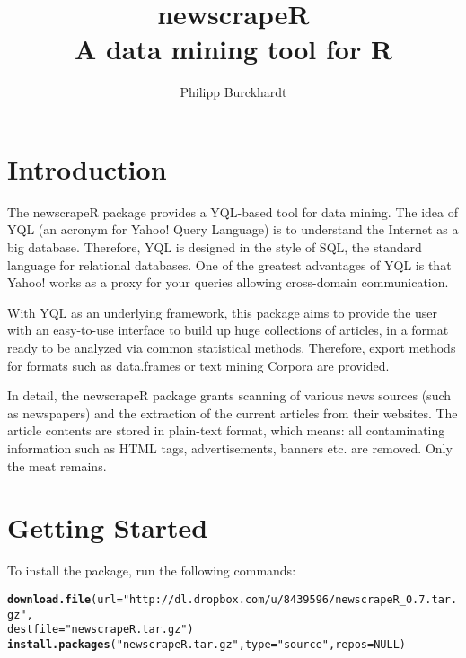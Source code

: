 \documentclass[a4paper,11pt]{article}\usepackage{graphicx, color}
\title{\textbf{newscrapeR} \\ A data mining tool for R}
\author{Philipp Burckhardt}
\makeatletter
\newcommand{\hlfunctioncall}[1]{\textcolor[rgb]{0.501960784313725,0,0.329411764705882}{\textbf{#1}}}%
\newcommand{\hlstring}[1]{\textcolor[rgb]{0.6,0.6,1}{#1}}%
\newenvironment{kframe}{%
 \def\at@end@of@kframe{}%
 \ifinner\ifhmode%
  \def\at@end@of@kframe{\end{minipage}}%
  \begin{minipage}{\columnwidth}%
 \fi\fi%
 \def\FrameCommand##1{\hskip\@totalleftmargin \hskip-\fboxsep
 \colorbox{shadecolor}{##1}\hskip-\fboxsep
     \hskip-\linewidth \hskip-\@totalleftmargin \hskip\columnwidth}%
 \MakeFramed {\advance\hsize-\width
   \@totalleftmargin\z@ \linewidth\hsize
   \@setminipage}}%
 {\par\unskip\endMakeFramed%
 \at@end@of@kframe}
\newenvironment{knitrout}{}{} %
\makeatother
\begin{document}
\maketitle

\section{Introduction}

The newscrapeR package provides a YQL-based tool for data mining. The idea of YQL (an acronym for Yahoo! Query Language) is to understand the Internet as a big database. Therefore, YQL is designed in the style of SQL, the standard language for relational databases. One of the greatest advantages of YQL is that Yahoo! works as a proxy for your queries allowing cross-domain communication.


With YQL as an underlying framework, this package aims to provide the user with an easy-to-use interface to build up huge collections of articles, in a format ready to be analyzed via common statistical methods. Therefore, export methods for formats such as data.frames or text mining Corpora are provided.

In detail, the newscrapeR package grants scanning of various news sources (such as newspapers) and the extraction of the current articles from their websites. The article contents are stored in plain-text format, which means: all contaminating information such as HTML tags, advertisements, banners etc. are removed. Only the meat remains. 

\section{Getting Started}

To install the package, run the following commands:

\begin{knitrout}
\color{fgcolor}\begin{kframe}
\begin{alltt}
\hlfunctioncall{download.file}(url = \hlstring{"http://dl.dropbox.com/u/8439596/newscrapeR_0.7.tar.gz"}, 
    destfile = \hlstring{"newscrapeR.tar.gz"})
\hlfunctioncall{install.packages}(\hlstring{"newscrapeR.tar.gz"}, type = \hlstring{"source"}, repos = NULL)
\end{alltt}
\end{kframe}
\end{knitrout}
\end{document}
